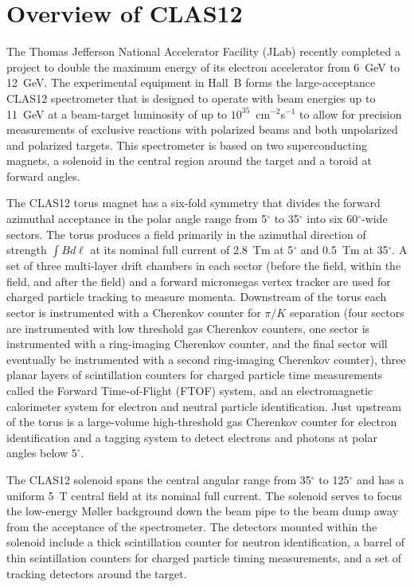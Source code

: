 \documentclass[3p,times,twocolumn]{elsarticle}
\begin{document}
\section{Overview of CLAS12}

The Thomas Jefferson National Accelerator Facility (JLab) recently completed a project to double
the maximum energy of its electron accelerator from 6~GeV to 12~GeV. The experimental equipment
in Hall~B forms the large-acceptance CLAS12 spectrometer that is designed to operate with beam
energies up to 11~GeV at a beam-target luminosity of up to $10^{35}$~cm$^{-2}$s$^{-1}$ to allow for
precision measurements of exclusive reactions with polarized beams and both unpolarized and polarized
targets. This spectrometer is based on two superconducting magnets, a solenoid in the central region
around the target and a toroid at forward angles. 

The CLAS12 torus magnet has a six-fold symmetry that divides the forward azimuthal acceptance in the
polar angle range from 5$^\circ$ to 35$^\circ$ into six 60$^\circ$-wide sectors. The torus produces a field
primarily in the azimuthal direction of strength $\int \!B d\ell$ at its nominal full current of 2.8~Tm at
5$^\circ$ and 0.5~Tm at 35$^\circ$. A set of three multi-layer drift chambers in each sector (before the
field, within the field, and after the field) and a forward micromegas vertex tracker are used for charged
particle tracking to measure momenta. Downstream of the torus each sector is instrumented with a Cherenkov
counter for $\pi/K$ separation (four sectors are instrumented with low threshold gas Cherenkov counters, one
sector is instrumented with a ring-imaging Cherenkov counter, and the final sector will eventually be
instrumented with a second ring-imaging Cherenkov counter), three planar layers of scintillation counters for
charged particle time measurements called the Forward Time-of-Flight (FTOF) system, and an electromagnetic
calorimeter system for electron and neutral particle identification. Just upstream of the torus is a large-volume
high-threshold gas Cherenkov counter for electron identification and a tagging system to detect electrons and
photons at polar angles below $5^\circ$.

The CLAS12 solenoid spans the central angular range from 35$^\circ$ to 125$^\circ$ and has a uniform 5~T
central field at its nominal full current. The solenoid serves to focus the low-energy M{\o}ller background down
the beam pipe to the beam dump away from the acceptance of the spectrometer. The detectors mounted within
the solenoid include a thick scintillation counter for neutron identification, a barrel of thin scintillation counters
for charged particle timing measurements, and a set of tracking detectors around the target.
\end{document}
